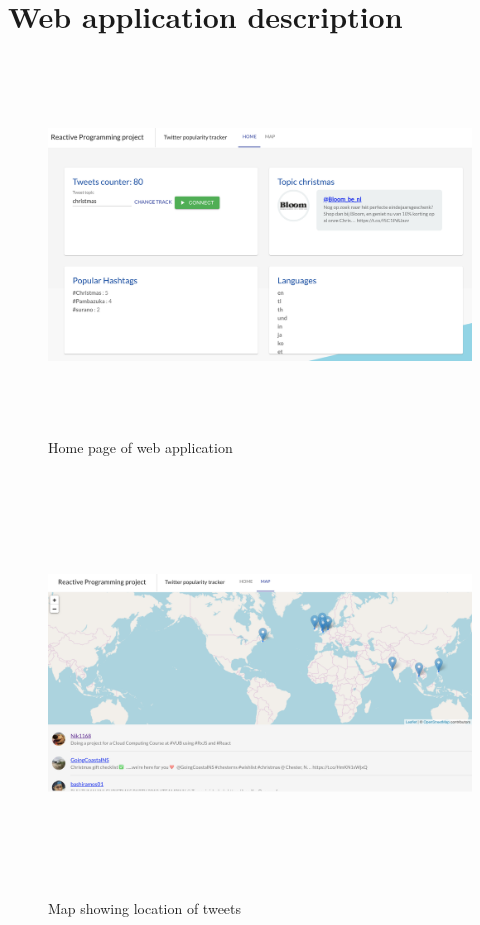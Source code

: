 \documentclass[12pt]{report}
\begin{document}
\section{Web application description}
\begin{figure}[h]
\centering
\includegraphics[width=15cm, height=10cm]{main_screen.png}
\caption{Home page of web application}
\label{fig:main_screen}
\end{figure}
\begin{figure}[h]
\centering
\includegraphics[width=15cm, height=11.2cm]{map_screen.png}
\caption{Map showing location of tweets}
\label{fig:map_screen}
\end{figure}
\end{document}

